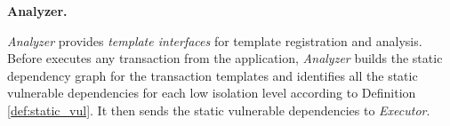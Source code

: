 
\noindent\textbf{Analyzer.} 
{
\textit{Analyzer} provides \textit{template interfaces} for template registration and analysis. 
Before \sysname executes any transaction from the application, \textit{Analyzer} builds the static dependency graph for the transaction templates and identifies all the static vulnerable dependencies for each low isolation level according to Definition \ref{def:static_vul}. It then sends the static vulnerable dependencies to \textit{Executor}.




}
